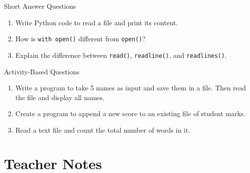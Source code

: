 \begin{exercise}{Short Answer Questions}
\begin{enumerate}
    \item Write Python code to read a file and print its content.  
    \item How is \texttt{with open()} different from \texttt{open()}?  
    \item Explain the difference between \texttt{read()}, \texttt{readline()}, and \texttt{readlines()}.  
\end{enumerate}
\end{exercise}

\begin{exercise}{Activity-Based Questions}
\begin{enumerate}
    \item Write a program to take 5 names as input and save them in a file. Then read the file and display all names.  
    \item Create a program to append a new score to an existing file of student marks.  
    \item Read a text file and count the total number of words in it.  
\end{enumerate}
\end{exercise}

\section{Teacher Notes}

